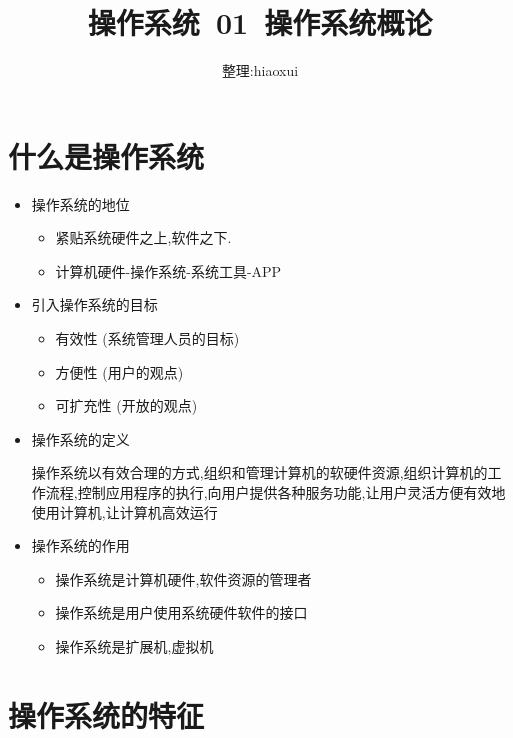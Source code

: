 \documentclass[a4paper,10pt,notitlepage]{article}
\begin{document}
\title{操作系统\ 01\ 操作系统概论}
\author{整理:hiaoxui}
\maketitle

\section{什么是操作系统} 

\begin{itemize}

	\item 操作系统的地位
	\begin{itemize}
		\item 紧贴系统硬件之上,软件之下.
		\item 计算机硬件-操作系统-系统工具-APP
	\end{itemize}
	
	\item 引入操作系统的目标
	\begin{itemize}
		\item 有效性 (系统管理人员的目标)
		\item 方便性 (用户的观点)
		\item 可扩充性 (开放的观点)
	\end{itemize}
	
	\item 操作系统的定义
	
	操作系统以有效合理的方式,组织和管理计算机的软硬件资源,组织计算机的工作流程,控制应用程序的执行,向用户提供各种服务功能,让用户灵活方便有效地使用计算机,让计算机高效运行
	
	\item 操作系统的作用
	\begin{itemize}
		\item 操作系统是计算机硬件,软件资源的管理者
		\item 操作系统是用户使用系统硬件软件的接口
		\item 操作系统是扩展机,虚拟机
	\end{itemize}	
	
\end{itemize}
	
\section{操作系统的特征}
	
\end{document}
